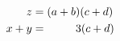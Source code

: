 \documentclass{article}
\begin{document}
\begin{align}
	z     & = (a + b)(c + d)            \\
	x + y & = \hphantom{(a + b}3(c + d)
\end{align}
\end{document}
